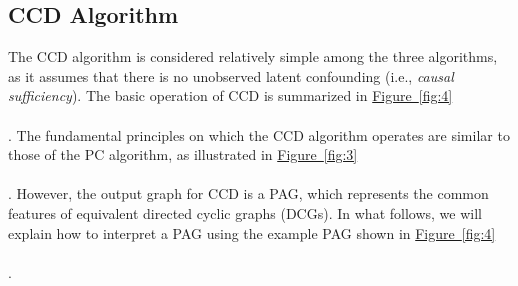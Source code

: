\documentclass[twoside, 11pt]{article}
\newcommand*{\figref}[2][]{%
  \hyperref[{fig:#2}]{%
    Figure~\ref*{fig:#2}%
    \ifx\\#1\\%
    \else
      #1%
    \fi
  }%
}
\begin{document}



\subsection{CCD Algorithm}
The CCD algorithm is considered relatively simple among the three algorithms, as it assumes that there is no unobserved latent confounding (i.e., \textit{causal sufficiency}). The basic operation of CCD is summarized in \figref[]{4}. The fundamental principles on which the CCD algorithm operates are similar to those of the PC algorithm, as illustrated in \figref[]{3}. However, the output graph for CCD is a PAG, which represents the common features of equivalent directed cyclic graphs (DCGs).
In what follows, we will explain how to interpret a PAG using the example PAG shown in \figref[]{4}.


\end{document}
